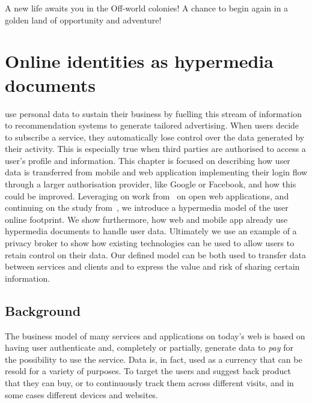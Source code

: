 \begin{savequote}[75mm]
A new life awaits you in the Off-world colonies! A chance to begin again in a golden land of opportunity and adventure!
\end{savequote}

\chapter{Online identities as hypermedia documents}

 use personal data to sustain their business by fuelling this stream of information to recommendation systems to generate tailored advertising. When users decide to subscribe a service, they automatically lose control over the data generated by their activity. This is especially true when third parties are authorised to access a user's profile and information. 
This chapter is focused on describing how user data is transferred from mobile and web application implementing their login flow through a larger authorisation provider, like Google or Facebook, and how this could be improved. Leveraging on work from~\cite{puglisi2015restful} on open web applications, and continuing on the study from~\cite{puglisi2015potential}, we introduce a hypermedia model of the user online footprint. We show furthermore, how web and mobile app already use hypermedia documents to handle user data. Ultimately we use an example of a privacy broker to show how existing technologies can be used to allow users to retain control on their data. Our defined model can be both used to transfer data between services and clients and to express the value and risk of sharing certain information.

\section{Background}

The business model of many services and applications on today's web is based on having user authenticate and, completely or partially, generate data to \emph{pay} for the possibility to use the service. Data is, in fact, used as a currency that can be resold for a variety of purposes. To target the users and suggest back product that they can buy, or to continuously track them across different visits, and in some cases different devices and websites.

